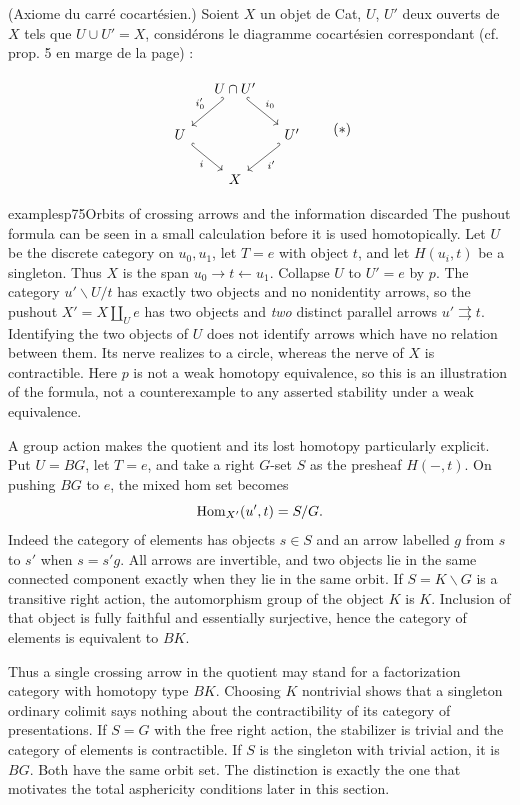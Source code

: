 \begin{description}[leftmargin=5em, style=nextline]
\item[W(7 bis)] (Axiome du carré cocartésien.) Soient $X$ un objet de Cat, $U$, $U'$ deux ouverts de $X$ tels que $U\cup U'=X$, considérons le diagramme cocartésien correspondant (cf. prop. 5 en marge de la page) :

\[
\begin{tikzcd}[column sep=small]
& U\cap U' \arrow[dl, hook', "i'_0"'] \arrow[dr, hook, "i_0"] & \\
U \arrow[dr, hook, "i"'] & & U' \arrow[dl, hook', "i'"] \\
& X &
\end{tikzcd}
\tag*{$(*)$}
\]

\begin{dcomment}{examples}{p75}{Orbits of crossing arrows and the information discarded}
The pushout formula can be seen in a small calculation before it is used homotopically. Let $U$ be the discrete category on $u_0,u_1$, let $T=e$ with object $t$, and let $H(u_i,t)$ be a singleton. Thus $X$ is the span $u_0\to t\leftarrow u_1$. Collapse $U$ to $U'=e$ by $p$. The category $u'\backslash U/t$ has exactly two objects and no nonidentity arrows, so the pushout $X'=X\amalg_Ue$ has two objects and \emph{two} distinct parallel arrows $u'\rightrightarrows t$. Identifying the two objects of $U$ does not identify arrows which have no relation between them. Its nerve realizes to a circle, whereas the nerve of $X$ is contractible. Here $p$ is not a weak homotopy equivalence, so this is an illustration of the formula, not a counterexample to any asserted stability under a weak equivalence.

A group action makes the quotient and its lost homotopy particularly explicit. Put $U=BG$, let $T=e$, and take a right $G$-set $S$ as the presheaf $H(-,t)$. On pushing $BG$ to $e$, the mixed hom set becomes
\[
 \mathrm{Hom}_{X'}(u',t)=S/G.
\]
Indeed the category of elements has objects $s\in S$ and an arrow labelled $g$ from $s$ to $s'$ when $s=s'g$. All arrows are invertible, and two objects lie in the same connected component exactly when they lie in the same orbit. If $S=K\backslash G$ is a transitive right action, the automorphism group of the object $K$ is $K$. Inclusion of that object is fully faithful and essentially surjective, hence the category of elements is equivalent to $BK$.

Thus a single crossing arrow in the quotient may stand for a factorization category with homotopy type $BK$. Choosing $K$ nontrivial shows that a singleton ordinary colimit says nothing about the contractibility of its category of presentations. If $S=G$ with the free right action, the stabilizer is trivial and the category of elements is contractible. If $S$ is the singleton with trivial action, it is $BG$. Both have the same orbit set. The distinction is exactly the one that motivates the total asphericity conditions later in this section.
\end{dcomment}



\end{description}
